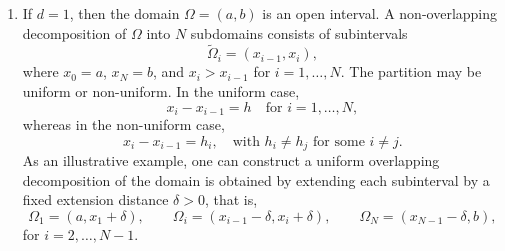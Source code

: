 \documentclass[a4paper, 11pt]{article}
\theoremstyle{remark}
\begin{document}
\begin{enumerate}[label=(\arabic*)]
\item If $d = 1$, then the domain $\Omega = (a,b)$ is an open interval. A non-overlapping decomposition of $\Omega$ into $N$ subdomains 
consists of subintervals 
\begin{equation*}
    \widetilde{\Omega}_i = (x_{i-1}, x_i),
\end{equation*}
where $x_0 = a$, $x_N = b$, and $x_i > x_{i-1}$ for $i = 1, \ldots, N$.
The partition may be uniform or non-uniform. In the uniform case,
\begin{equation*}
    x_i - x_{i-1} = h \quad \text{for } i = 1, \ldots, N,
\end{equation*}
whereas in the non-uniform case,
\begin{equation*}
    x_i - x_{i-1} = h_i, \quad \text{with } h_i \neq h_j \text{ for some } i \neq j.
\end{equation*}
As an illustrative example, one can construct a uniform overlapping decomposition of the domain is obtained by extending each subinterval by a fixed extension distance $\delta > 0$, that is,
\begin{equation*}
    \Omega_1 = (a, x_1 + \delta), \qquad \Omega_i = (x_{i-1} - \delta, x_i + \delta), \qquad \Omega_N = (x_{N-1} - \delta, b),
\end{equation*}
for $i = 2, \ldots, N-1$.


\end{enumerate}
\end{document}
